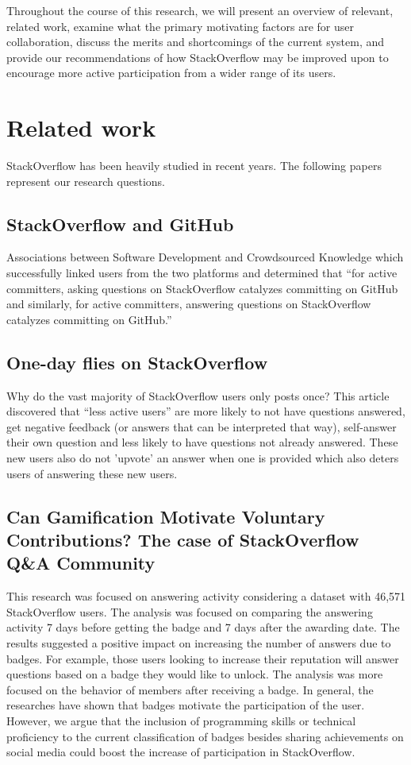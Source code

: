 \documentclass{sigchi}
\begin{document}
Throughout the course of this research, we will present an overview of relevant, related work, examine what the primary motivating factors are for user collaboration, discuss the merits and shortcomings of the current system, and provide our recommendations of how StackOverflow may be improved upon to encourage more active participation from a wider range of its users. 

\section{Related work}
StackOverflow has been heavily studied in recent years. The following papers represent our research questions.

\subsection{StackOverflow and GitHub}

Associations between Software Development and Crowdsourced Knowledge which
successfully linked users from the two platforms and determined that “for
active committers, asking questions on StackOverflow catalyzes committing on
GitHub and similarly, for active committers, answering questions on
StackOverflow catalyzes committing on GitHub.”

\subsection{One-day flies on StackOverflow}

Why do the vast majority of StackOverflow users only posts once? This article 
discovered that “less active users” are more likely to not have questions answered, 
get negative feedback (or answers that can be interpreted that way), self-answer
their own question and less likely to have questions not already answered. These new
users also do not 'upvote' an answer when one is provided which also deters users of answering these new users.

\subsection{Can Gamification Motivate Voluntary Contributions? The case of
StackOverflow Q\&A Community}

This research was focused on answering activity considering a dataset with 46,571 StackOverflow users. The analysis was focused on comparing the answering activity 7 days before getting the badge and 7 days after the awarding date. The results suggested a positive impact on increasing the number of answers due to badges. For example, those users looking to increase their reputation will answer questions based on a badge they would like to unlock. The analysis was more focused on the behavior of members after receiving a badge. In general, the researches have shown that badges motivate the participation of the user. However, we argue that the inclusion of programming skills or technical proficiency to the current classification of badges besides sharing achievements on social media could boost the increase of participation in StackOverflow.
\end{document}

